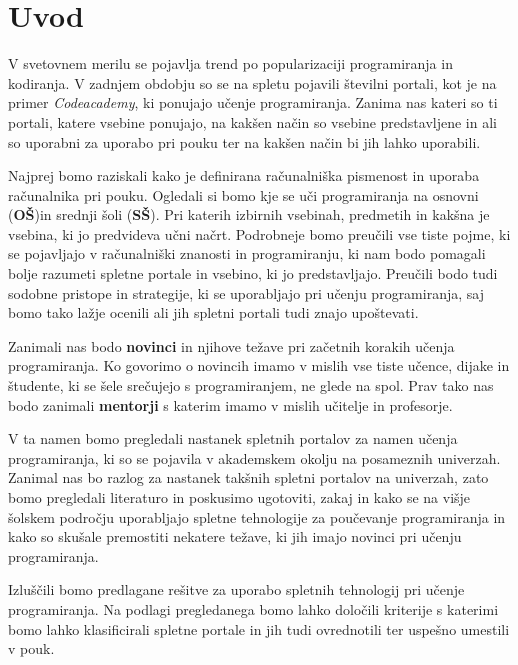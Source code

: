 \section{Uvod}
\label{sec:Uvod}


V svetovnem merilu se pojavlja trend po popularizaciji programiranja
in kodiranja. V zadnjem obdobju so se na spletu pojavili številni
portali, kot je na primer \emph{Codeacademy}, ki ponujajo učenje
programiranja. Zanima nas kateri so ti portali, katere vsebine
ponujajo, na kakšen način so vsebine predstavljene in ali so uporabni
za uporabo pri pouku ter na kakšen način bi jih lahko uporabili.

Najprej bomo raziskali kako je definirana računalniška pismenost in
uporaba računalnika pri pouku. Ogledali si bomo kje se uči
programiranja na osnovni (\textbf{OŠ})in srednji šoli
(\textbf{SŠ}). Pri katerih izbirnih vsebinah, predmetih in kakšna je
vsebina, ki jo predvideva učni načrt. Podrobneje bomo preučili vse
tiste pojme, ki se pojavljajo v računalniški znanosti in
programiranju, ki nam bodo pomagali bolje razumeti spletne portale in
vsebino, ki jo predstavljajo.  Preučili bodo tudi sodobne pristope in
strategije, ki se uporabljajo pri učenju programiranja, saj bomo tako
lažje ocenili ali jih spletni portali tudi znajo upoštevati.

Zanimali nas bodo \textbf{novinci} in njihove težave pri začetnih
korakih učenja programiranja. Ko govorimo o novincih imamo v mislih
vse tiste učence, dijake in študente, ki se šele srečujejo s
programiranjem, ne glede na spol. Prav tako nas bodo zanimali
\textbf{mentorji} s katerim imamo v mislih učitelje in profesorje.

V ta namen bomo pregledali nastanek spletnih portalov za namen učenja
programiranja, ki so se pojavila v akademskem okolju na posameznih
univerzah. Zanimal nas bo razlog za nastanek takšnih spletni portalov
na univerzah, zato bomo pregledali literaturo in poskusimo ugotoviti,
zakaj in kako se na višje šolskem področju uporabljajo spletne
tehnologije za poučevanje programiranja in kako so skušale premostiti
nekatere težave, ki jih imajo novinci pri učenju programiranja.

Izluščili bomo predlagane rešitve za uporabo spletnih tehnologij pri
učenje programiranja. Na podlagi pregledanega bomo lahko določili
kriterije s katerimi bomo lahko klasificirali spletne portale in jih
tudi ovrednotili ter uspešno umestili v pouk.



